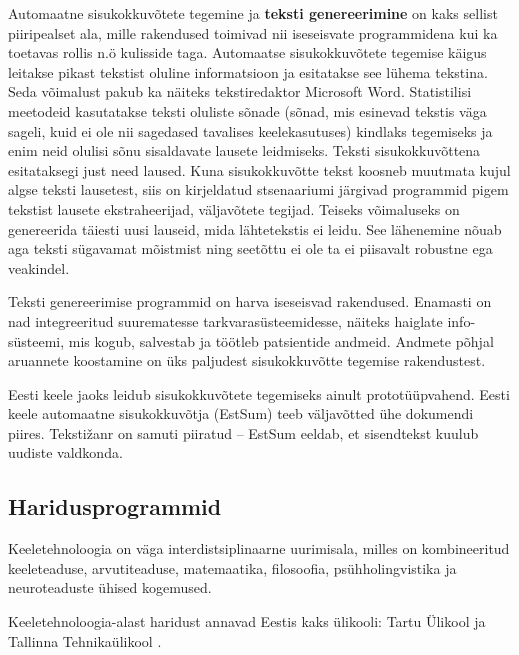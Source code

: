\begin{multicols}{2}
Automaatne sisukokkuvõtete tegemine ja \textbf{teksti genereerimine} on kaks sellist piiripealset ala, mille rakendused toimivad nii iseseisvate programmidena kui ka toetavas rollis n.ö kulisside taga.  Automaatse sisukokkuvõtete tegemise käigus leitakse pikast tekstist oluline informatsioon ja esitatakse see lühema tekstina.  Seda võimalust pakub ka näiteks tekstiredaktor Microsoft Word.  Statistilisi meetodeid kasutatakse teksti oluliste sõnade (sõnad, mis esinevad tekstis väga sageli, kuid ei ole nii sagedased tavalises keelekasutuses) kindlaks tegemiseks ja enim neid olulisi sõnu sisaldavate lausete leidmiseks.  Teksti sisukokkuvõttena esitataksegi just need laused.  Kuna sisukokkuvõtte tekst koosneb muutmata kujul algse teksti lausetest, siis on kirjeldatud stsenaariumi järgivad programmid pigem tekstist lausete ekstraheerijad, väljavõtete tegijad.  Teiseks võimaluseks on genereerida täiesti uusi lauseid, mida lähtetekstis ei leidu.  See lähenemine nõuab aga teksti sügavamat mõistmist ning seetõttu ei ole ta ei piisavalt robustne ega veakindel.

Teksti genereerimise programmid on harva iseseisvad rakendused. Enamasti on nad integreeritud suurematesse tarkvarasüsteemidesse, näiteks haiglate info- süsteemi, mis kogub, salvestab ja töötleb patsientide andmeid.  Andmete põhjal aruannete koostamine on üks paljudest sisukokkuvõtte tegemise rakendustest.

Eesti keele jaoks leidub sisukokkuvõtete tegemiseks ainult prototüüpvahend.  Eesti keele automaatne sisukokkuvõtja (EstSum) teeb väljavõtted ühe dokumendi piires. Tekstižanr on samuti piiratud -- EstSum eeldab, et sisendtekst kuulub uudiste valdkonda.

\subsection{Haridusprogrammid}

Keeletehnoloogia on väga interdistsiplinaarne uurimisala, milles on kombineeritud keeleteaduse, arvutiteaduse, matemaatika, filosoofia, psühholingvistika ja neuroteaduste ühised kogemused.

Keeletehnoloogia-alast haridust annavad Eestis kaks ülikooli: Tartu Ülikool ja Tallinna Tehnikaülikool \cite{Meisteretal}.


\end{multicols}
